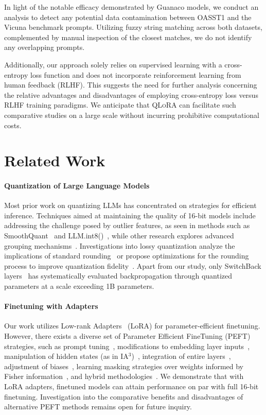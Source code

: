 In light of the notable efficacy demonstrated by {Guanaco} models, we conduct an analysis to detect any potential data contamination between OASST1 and the Vicuna benchmark prompts. Utilizing fuzzy string matching across both datasets, complemented by manual inspection of the closest matches, we do not identify any overlapping prompts.

Additionally, our approach solely relies on supervised learning with a cross-entropy loss function and does not incorporate reinforcement learning from human feedback (RLHF). This suggests the need for further analysis concerning the relative advantages and disadvantages of employing cross-entropy loss versus RLHF training paradigms. We anticipate that \textsc{QLoRA} can facilitate such comparative studies on a large scale without incurring prohibitive computational costs.

\section{Related Work}

\paragraph{Quantization of Large Language Models} Most prior work on quantizing LLMs has concentrated on strategies for efficient inference. Techniques aimed at maintaining the quality of 16-bit models include addressing the challenge posed by outlier features, as seen in methods such as SmoothQuant~\citep{xiao2022smoothquant} and LLM.int8()~\citep{dettmers2022llm}, while other research explores advanced grouping mechanisms~\citep{park2022nuqmm, yao2022zeroquant}. Investigations into lossy quantization analyze the implications of standard rounding~\citep{dettmers2022case, zeng2022glm, pope2022efficiently} or propose optimizations for the rounding process to improve quantization fidelity~\citep{frantar2022gptq}. Apart from our study, only SwitchBack layers~\citep{wortsman2023stable} has systematically evaluated backpropagation through quantized parameters at a scale exceeding 1B parameters.

\paragraph{Finetuning with Adapters} Our work utilizes Low-rank Adapters~\citep{hu2021lora} (LoRA) for parameter-efficient finetuning. However, there exists a diverse set of Parameter Efficient FineTuning (PEFT) strategies, such as prompt tuning~\citep{qin2021learning,lester2021power,li2021prefix}, modifications to embedding layer inputs~\citep{an2022input}, manipulation of hidden states (as in IA$^3$)~\citep{liu2022few}, integration of entire layers~\citep{houlsby2019parameter}, adjustment of biases~\citep{zaken2021bitfit}, learning masking strategies over weights informed by Fisher information~\citep{sung2021training}, and hybrid methodologies~\citep{henderson2021compacter}. We demonstrate that with LoRA adapters, finetuned models can attain performance on par with full 16-bit finetuning. Investigation into the comparative benefits and disadvantages of alternative PEFT methods remains open for future inquiry.

